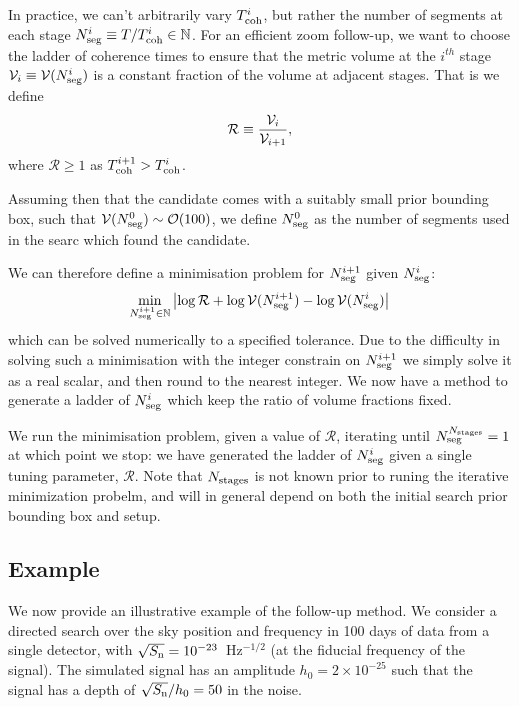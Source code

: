\documentclass[aps, prd, twocolumn, superscriptaddress, floatfix, showpacs, nofootinbib, longbibliography]{revtex4-1}
\begin{document}
In practice, we can't arbitrarily vary $T_{\rm coh}^i$, but rather the
number of segments at each stage $N_{\rm seg}^{i}\equiv T/T_{\rm coh}^{i} \in
\mathbb{N}$. For an efficient zoom follow-up, we want to choose the ladder of
coherence times to ensure that
the metric volume at the $i^{th}$ stage $\mathcal{V}_i \equiv \mathcal{V}(N_{\rm seg}^i)$ is a constant
fraction of the volume at adjacent stages. That is we define
\begin{equation}
\mathcal{R} \equiv \frac{\mathcal{V}_i}{\mathcal{V}_{i+1}},
\end{equation}
where $\mathcal{R} \ge 1$ as $T_{\rm coh}^{i+1} > T_{\rm coh}^{i}$.

Assuming then that the candidate comes with a suitably small prior bounding box,
such that $\mathcal{V}(N_{\rm seg}^{0}) \sim \mathcal{O}(100)$, we define $N_{\rm seg}^0$ as the
number of segments used in the searc which found the candidate.

We can therefore define a minimisation problem for $N_{\rm seg}^{i+1}$ given $N_{\rm seg}^{i}$:
\begin{align}
\min_{N_{\rm seg}^{i+1} \in \mathbb{N}}
\left| \log\mathcal{R} + \log\mathcal{V}(N_{\rm seg}^{i+1}) - \log\mathcal{V}(N_{\rm seg}^i)\right|
\end{align}
which can be solved numerically to a specified tolerance. Due to the difficulty
in solving such a minimisation with the integer constrain on $N_{\rm seg}^{i+1}$ we
simply solve it as a real scalar, and then round to the nearest integer. We now
have a method to generate a ladder of $N_{\rm seg}^{i}$ which keep the ratio of
volume fractions fixed.

We run the minimisation problem, given a value of $\mathcal{R}$, iterating
until $N_{\rm seg}^{N_{\rm stages}} = 1$ at which point we stop: we have generated the
ladder of $N_{\rm seg}^i$ given a single tuning parameter, $\mathcal{R}$. Note that
$N_{\rm stages}$ is not known prior to runing the iterative minimization probelm, and
will in general depend on both the initial search prior bounding box and setup.

\subsection{Example}

We now provide an illustrative example of the follow-up method. We consider a
directed search over the sky position and frequency in 100 days of data from a
single detector, with $\sqrt{S_{\rm n}}=10^{-23}$~Hz$^{-1/2}$ (at the fiducial
frequency of the signal). The simulated signal has an amplitude
$h_0=2\times10^{-25}$ such that the signal has a depth of $\sqrt{S_{\rm n}}/h_0=50$
in the noise.
\end{document}
